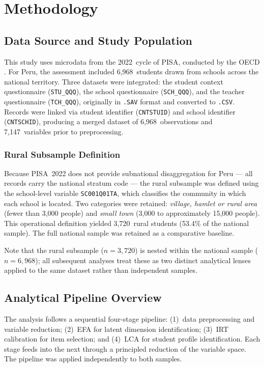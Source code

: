 \documentclass[twocolumn,12pt]{article}
\begin{document}
\section{Methodology}

\subsection{Data Source and Study Population}

This study uses microdata from the 2022~cycle of PISA, conducted by the
OECD \parencite{oecd2023technical}. For Peru, the assessment included
6,968~students drawn from schools across the national territory. Three
datasets were integrated: the student context questionnaire
(\texttt{STU\_QQQ}), the school questionnaire (\texttt{SCH\_QQQ}), and the
teacher questionnaire (\texttt{TCH\_QQQ}), originally in \texttt{.SAV}
format and converted to \texttt{.CSV}. Records were linked via student
identifier (\texttt{CNTSTUID}) and school identifier (\texttt{CNTSCHID}),
producing a merged dataset of 6,968~observations and 7,147~variables prior
to preprocessing.

\subsubsection{Rural Subsample Definition}

Because PISA~2022 does not provide subnational disaggregation for Peru ---
all records carry the national stratum code --- the rural subsample was
defined using the school-level variable \texttt{SC001Q01TA}, which classifies
the community in which each school is located. Two categories were retained:
\textit{village, hamlet or rural area} (fewer than 3,000 people) and
\textit{small town} (3,000 to approximately 15,000 people). This operational
definition yielded 3,720~rural students (53.4\% of the national sample). The
full national sample was retained as a comparative baseline.

Note that the rural subsample (\(n = 3{,}720\)) is nested
within the national sample (\(n = 6{,}968\)); all subsequent
analyses treat these as two distinct analytical lenses applied
to the same dataset rather than independent samples.

\subsection{Analytical Pipeline Overview}

The analysis follows a sequential four-stage pipeline: (1)~data
preprocessing and variable reduction; (2)~EFA for latent dimension
identification; (3)~IRT calibration for item selection; and (4)~LCA for
student profile identification. Each stage feeds into the next through a
principled reduction of the variable space. The pipeline was applied
independently to both samples.
\end{document}
